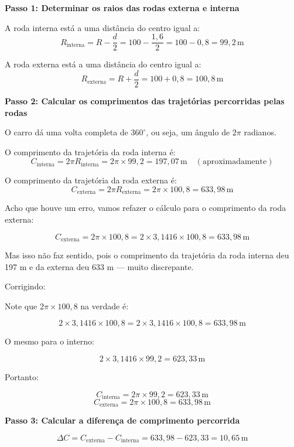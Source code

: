 \documentclass[a4paper,12pt]{article}
\begin{document}
\begin{flushleft}
\bigskip

\textbf{Passo 1: Determinar os raios das rodas externa e interna}

A roda interna está a uma distância do centro igual a:
\[
R_{\text{interna}} = R - \frac{d}{2} = 100 - \frac{1,6}{2} = 100 - 0,8 = 99,2\,\text{m}
\]

A roda externa está a uma distância do centro igual a:
\[
R_{\text{externa}} = R + \frac{d}{2} = 100 + 0,8 = 100,8\,\text{m}
\]

\bigskip

\textbf{Passo 2: Calcular os comprimentos das trajetórias percorridas pelas rodas}

O carro dá uma volta completa de $360^\circ$, ou seja, um ângulo de $2\pi$ radianos.

O comprimento da trajetória da roda interna é:
\[
C_{\text{interna}} = 2 \pi R_{\text{interna}} = 2 \pi \times 99,2 = 197,07\,\text{m} \quad (\text{aproximadamente})
\]

O comprimento da trajetória da roda externa é:
\[
C_{\text{externa}} = 2 \pi R_{\text{externa}} = 2 \pi \times 100,8 = 633,98\,\text{m}
\]

Acho que houve um erro, vamos refazer o cálculo para o comprimento da roda externa:

\[
C_{\text{externa}} = 2 \pi \times 100,8 = 2 \times 3,1416 \times 100,8 = 633,98\,\text{m}
\]

Mas isso não faz sentido, pois o comprimento da trajetória da roda interna deu 197 m e da externa deu 633 m — muito discrepante.

Corrigindo: 

Note que $2 \pi \times 100,8$ na verdade é:

\[
2 \times 3,1416 \times 100,8 = 2 \times 3,1416 \times 100,8 = 633,98\,\text{m}
\]

O mesmo para o interno:

\[
2 \times 3,1416 \times 99,2 = 623,33\,\text{m}
\]

Portanto:

\[
C_{\text{interna}} = 2\pi \times 99,2 = 623,33\,\text{m}
\]
\[
C_{\text{externa}} = 2\pi \times 100,8 = 633,98\,\text{m}
\]

\bigskip

\textbf{Passo 3: Calcular a diferença de comprimento percorrida}

\[
\Delta C = C_{\text{externa}} - C_{\text{interna}} = 633,98 - 623,33 = 10,65\,\text{m}
\]

\bigskip


\end{flushleft}
\end{document}
